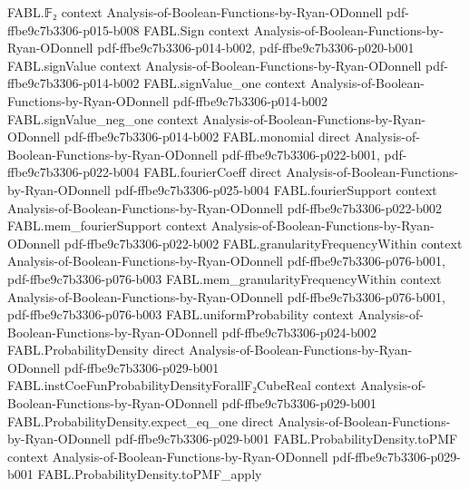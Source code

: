 \begin{theorem}
\label{FABL.ProbabilityDensity.nonneg}
\leanok
{}
\proofstep
  {FABL.𝔽₂}
  {context}
  {Analysis-of-Boolean-Functions-by-Ryan-ODonnell}
  {pdf-ffbe9c7b3306-p015-b008}
\proofstep
  {FABL.Sign}
  {context}
  {Analysis-of-Boolean-Functions-by-Ryan-ODonnell}
  {pdf-ffbe9c7b3306-p014-b002,
    pdf-ffbe9c7b3306-p020-b001}
\proofstep
  {FABL.signValue}
  {context}
  {Analysis-of-Boolean-Functions-by-Ryan-ODonnell}
  {pdf-ffbe9c7b3306-p014-b002}
\proofstep
  {FABL.signValue_one}
  {context}
  {Analysis-of-Boolean-Functions-by-Ryan-ODonnell}
  {pdf-ffbe9c7b3306-p014-b002}
\proofstep
  {FABL.signValue_neg_one}
  {context}
  {Analysis-of-Boolean-Functions-by-Ryan-ODonnell}
  {pdf-ffbe9c7b3306-p014-b002}
\proofstep
  {FABL.monomial}
  {direct}
  {Analysis-of-Boolean-Functions-by-Ryan-ODonnell}
  {pdf-ffbe9c7b3306-p022-b001,
    pdf-ffbe9c7b3306-p022-b004}
\proofstep
  {FABL.fourierCoeff}
  {direct}
  {Analysis-of-Boolean-Functions-by-Ryan-ODonnell}
  {pdf-ffbe9c7b3306-p025-b004}
\proofstep
  {FABL.fourierSupport}
  {context}
  {Analysis-of-Boolean-Functions-by-Ryan-ODonnell}
  {pdf-ffbe9c7b3306-p022-b002}
\proofstep
  {FABL.mem_fourierSupport}
  {context}
  {Analysis-of-Boolean-Functions-by-Ryan-ODonnell}
  {pdf-ffbe9c7b3306-p022-b002}
\proofstep
  {FABL.granularityFrequencyWithin}
  {context}
  {Analysis-of-Boolean-Functions-by-Ryan-ODonnell}
  {pdf-ffbe9c7b3306-p076-b001,
    pdf-ffbe9c7b3306-p076-b003}
\proofstep
  {FABL.mem_granularityFrequencyWithin}
  {context}
  {Analysis-of-Boolean-Functions-by-Ryan-ODonnell}
  {pdf-ffbe9c7b3306-p076-b001,
    pdf-ffbe9c7b3306-p076-b003}
\proofstep
  {FABL.uniformProbability}
  {context}
  {Analysis-of-Boolean-Functions-by-Ryan-ODonnell}
  {pdf-ffbe9c7b3306-p024-b002}
\proofstep
  {FABL.ProbabilityDensity}
  {direct}
  {Analysis-of-Boolean-Functions-by-Ryan-ODonnell}
  {pdf-ffbe9c7b3306-p029-b001}
\proofstep
  {FABL.instCoeFunProbabilityDensityForallF₂CubeReal}
  {context}
  {Analysis-of-Boolean-Functions-by-Ryan-ODonnell}
  {pdf-ffbe9c7b3306-p029-b001}
\proofstep
  {FABL.ProbabilityDensity.expect_eq_one}
  {direct}
  {Analysis-of-Boolean-Functions-by-Ryan-ODonnell}
  {pdf-ffbe9c7b3306-p029-b001}
\proofstep
  {FABL.ProbabilityDensity.toPMF}
  {context}
  {Analysis-of-Boolean-Functions-by-Ryan-ODonnell}
  {pdf-ffbe9c7b3306-p029-b001}
\proofstep
  {FABL.ProbabilityDensity.toPMF_apply}

\end{theorem}
